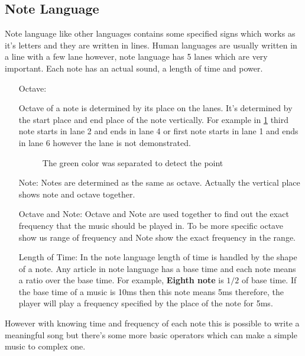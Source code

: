 \subsection{Note Language}
Note language like other languages contains some specified signs which works as it's letters and they are written in lines. Human languages are usually written in a line with a few lane however, note language has 5 lanes which are very important. Each note has an actual sound, a length of time and power. 
\begin{itemize}
\item[Octave: ]{Octave of a note is determined by its place on the lanes. It's determined by the start place and end place of the note vertically. For example in \ref{fig:notes} third note starts in lane 2 and ends in lane 4 or first note starts in lane 1 and ends in lane 6 however the lane is not demonstrated.

\begin{figure}
\caption{The green color was separated to detect the point}
\label{fig:notes}
\end{figure}


}
\item[Note: ]{Notes are determined as the same as octave. Actually the vertical place shows note and octave together.}
\item[Octave and Note: ]{Octave and Note are used together to find out the exact frequency that the music should be played in. To be more specific octave show us range of frequency and Note show the exact frequency in the range.}
\item[Length of Time: ]{In the note language length of time is handled by the shape of a  note. Any article in note language has a base time and each note means a ratio over the base time. For example, \textbf{Eighth note} 
is $1/2$ of base time. If the base time of a music is 10ms then this note means 5ms therefore, the player will play a frequency specified by the place of the note for 5ms.}
\end{itemize}
However with knowing time and frequency of each note this is possible to write a meaningful song but there's some more basic operators which can make a simple music to complex one.
